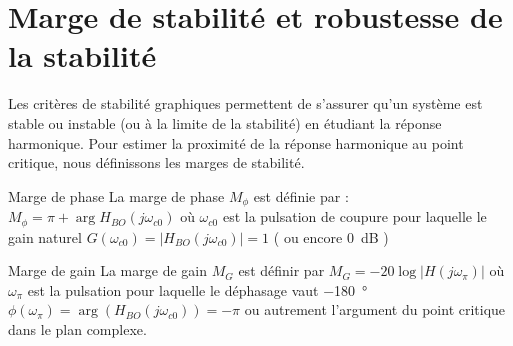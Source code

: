 \section{Marge de stabilité et robustesse de la stabilité}
Les critères de stabilité graphiques permettent de s'assurer qu'un système 
est stable ou instable (ou à la limite de la stabilité) en étudiant la réponse
harmonique. Pour estimer la proximité de la réponse harmonique au point 
critique, nous définissons les marges de stabilité. 
\begin{definition}{Marge de phase}
La marge de phase $M_{\phi}$ est définie par :
$M_\phi=\pi+\arg{H_{BO}(j\omega_{c0})}$ où $\omega_{c0}$ est la pulsation de 
coupure pour laquelle le gain naturel $G(\omega_{c0})=|H_{BO}(j\omega_{c0})|=1$
( ou encore 0~\si{\dB} ) 
\end{definition}
\begin{definition}{Marge de gain}
La marge de gain $M_G$ est définir par $M_G=-20\log{|H(j\omega_\pi)|}$ où 
$\omega_{\pi}$ est la pulsation pour laquelle le déphasage vaut 
\SI{-180}{\degree} $\phi(\omega_\pi)=\arg{(H_{BO}(j\omega_{c0}))}=-\pi$
ou autrement l'argument du point critique dans le plan complexe.
\end{definition}
